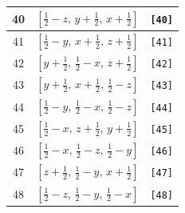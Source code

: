 \documentclass[fleqn,8pt]{jsarticle}
\begin{document}
\begin{longtable}{ccc}
40 & $\left[ \frac{1}{2} - z,\, y + \frac{1}{2},\, x + \frac{1}{2} \right]$ & {\tt [40]} \\ \hline
41 & $\left[ \frac{1}{2} - y,\, x + \frac{1}{2},\, z + \frac{1}{2} \right]$ & {\tt [41]} \\ \hline
42 & $\left[ y + \frac{1}{2},\, \frac{1}{2} - x,\, z + \frac{1}{2} \right]$ & {\tt [42]} \\ \hline
43 & $\left[ y + \frac{1}{2},\, x + \frac{1}{2},\, \frac{1}{2} - z \right]$ & {\tt [43]} \\ \hline
44 & $\left[ \frac{1}{2} - y,\, \frac{1}{2} - x,\, \frac{1}{2} - z \right]$ & {\tt [44]} \\ \hline
45 & $\left[ \frac{1}{2} - x,\, z + \frac{1}{2},\, y + \frac{1}{2} \right]$ & {\tt [45]} \\ \hline
46 & $\left[ \frac{1}{2} - x,\, \frac{1}{2} - z,\, \frac{1}{2} - y \right]$ & {\tt [46]} \\ \hline
47 & $\left[ z + \frac{1}{2},\, \frac{1}{2} - y,\, x + \frac{1}{2} \right]$ & {\tt [47]} \\ \hline
48 & $\left[ \frac{1}{2} - z,\, \frac{1}{2} - y,\, \frac{1}{2} - x \right]$ & {\tt [48]} \\
\end{longtable}
\end{document}
